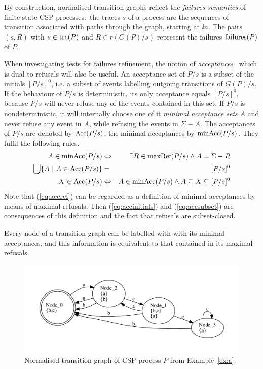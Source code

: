 By construction, normalised transition graphs reflect the \emph{failures
semantics} of finite-state CSP processes:~the traces $s$ of a process are the
sequences of transition associated with paths through the graph,
starting at $\ii n$. The pairs $(s,R)$ with $s\in\text{trc}(P)$ and $R\in
r(G(P)/s)$ represent the failures ${\text {\rm failures}}(P)$ of $P$.

When investigating  tests for failures refinement, 
the notion of \emph{acceptances}~\cite{Hennessy:1988:ATP:50497} 
which is dual to refusals will also be useful. An acceptance set of $P/s$ is a subset
of the initials $[P/s]^0$, i.e. a subset of events labelling  outgoing transitions
of $G(P)/s$. If the behaviour of  $P/s$ is deterministic, its only acceptance equals
$[P/s]^0$, because $P/s$ will never refuse any of the events contained in this set. If
$P/s$ is nondeterministic, it will internally choose one of it 
\emph{minimal acceptance sets} $A$ and never refuse any event in $A$, while refusing the
events in $\Sigma-A$. The acceptances of 
 $P/s$ are denoted by $\text{Acc}(P/s)$, the minimal acceptances by $\text{minAcc}(P/s)$. 
 They fulfil the following rules.
\begin{eqnarray}
A\in \text{minAcc}(P/s) & \Leftrightarrow & \exists R\in\text{maxRef}(P/s) \wedge A = \Sigma-R
\label{eq:accref}
\\
\bigcup \{ A~|~A\in \text{Acc}(P/s)\} & = & [P/s]^0
\label{eq:accinitials}
\\
 X\in\text{Acc}(P/s) &\Leftrightarrow & A\in \text{minAcc}(P/s) \wedge A\subseteq X \subseteq [P/s]^0
 \label{eq:accsubset}
\end{eqnarray} 
Note that (\ref{eq:accref}) can be regarded as a definition of minimal acceptances by means
of maximal refusals. Then (\ref{eq:accinitials}) and (\ref{eq:accsubset}) are consequences
of this definition and  the fact that refusals are subset-closed.

Every node of a transition graph can be labelled with with its minimal acceptances, and this information is equivalent to 
that contained in its maximal refusals.

 \begin{figure}
 \begin{center}
\includegraphics[width=\textwidth]{q0.pdf}
\end{center}
\caption{Normalised transition graph of CSP process $P$ from Example~\ref{ex:a}.}
 \label{fig:tga}
 \end{figure}

